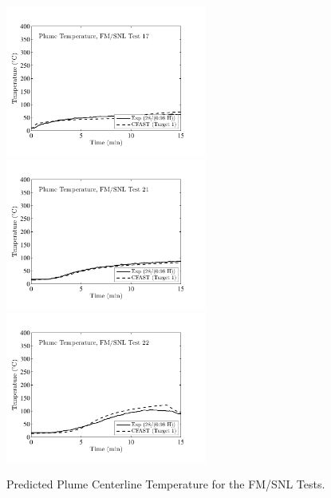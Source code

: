 \begin{figure}[p]
\begin{center}
\includegraphics[width=2.6in]{FIGURES/FM_SNL/FM_SNL_17_Plume_Temperature} \\
\includegraphics[width=2.6in]{FIGURES/FM_SNL/FM_SNL_21_Plume_Temperature} \\
\includegraphics[width=2.6in]{FIGURES/FM_SNL/FM_SNL_22_Plume_Temperature} 
\end{center}
\caption{Predicted Plume Centerline Temperature for the FM/SNL Tests.} 
\end{figure}

